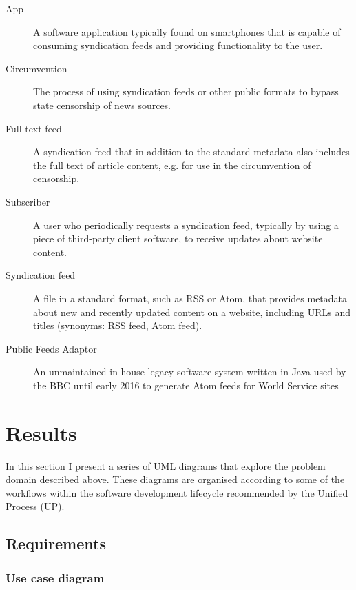\documentclass[a4paper]{article}
\begin{document}
\begin{description}

\item [App]
A software application typically found on smartphones that is capable of consuming syndication feeds and providing functionality to the user.

\item [Circumvention]
The process of using syndication feeds or other public formats to bypass state censorship of news sources.

\item [Full-text feed]
A syndication feed that in addition to the standard metadata also includes the full text of article content, e.g. for use in the circumvention of censorship.

\item [Subscriber]
A user who periodically requests a syndication feed, typically by using a piece of third-party client software, to receive updates about website content.

\item [Syndication feed]
A file in a standard format, such as RSS or Atom, that provides metadata about new and recently updated content on a website, including URLs and titles (synonyms: RSS feed, Atom feed).

\item [Public Feeds Adaptor]
An unmaintained in-house legacy software system written in Java used by the BBC until early 2016 to generate Atom feeds for World Service sites

\end{description}

\section{Results}

In this section I present a series of UML diagrams that explore the problem domain described above. These diagrams are organised according to some of the workflows within the software development lifecycle recommended by the Unified Process (UP).

\subsection{Requirements}

\subsubsection{Use case diagram}
\end{document}
